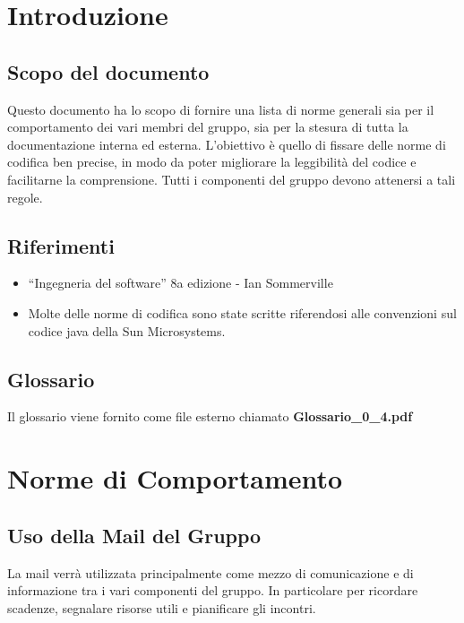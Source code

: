 \documentclass[11pt,titlepage,a4paper]{report}
\begin{document}
\begin{center}
\begin{table}[hbtp]
{}
\end{table}
\end{center}


\newpage
\tableofcontents 

\chapter{Introduzione}
\section{Scopo del documento}
Questo documento ha lo scopo di fornire una lista di norme generali sia per il comportamento dei vari membri del gruppo, sia per la stesura di tutta la documentazione interna ed esterna. L'obiettivo \`e quello di fissare delle norme di codifica ben precise, in modo da poter migliorare la leggibilit\`a del codice e facilitarne la comprensione. Tutti i componenti del gruppo devono attenersi a tali regole.
\section{Riferimenti}
\begin{itemize}
\item ``Ingegneria del software'' 8a edizione - Ian Sommerville 
\item Molte delle norme di codifica sono state scritte riferendosi alle convenzioni sul codice java della Sun Microsystems.
\end{itemize}
\section{Glossario}
Il glossario viene fornito come file esterno chiamato \textbf {Glossario\_0\_4.pdf} 

\chapter{Norme di Comportamento}
\section{Uso della Mail del Gruppo}
La mail verr\`a utilizzata principalmente come mezzo di comunicazione e di informazione tra i vari componenti del gruppo. In particolare per ricordare scadenze, segnalare risorse utili e pianificare gli incontri. 
\end{document}
